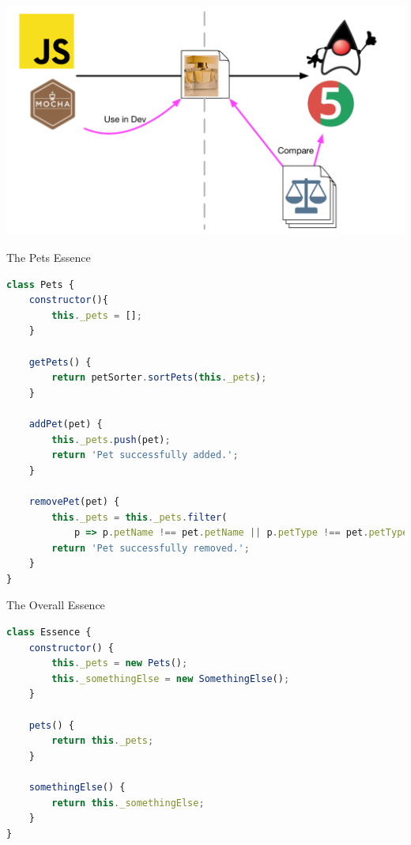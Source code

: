 \begin{frame}[fragile]{}

\includegraphics[width=\textwidth]{images/Essence-4.pdf}

\end{frame}


\begin{frame}[fragile]{The Pets Essence}

\begin{lstlisting}[language=JavaScript]
class Pets {
    constructor(){
        this._pets = [];
    }

    getPets() {
        return petSorter.sortPets(this._pets);
    }

    addPet(pet) {
        this._pets.push(pet);
        return 'Pet successfully added.';
    }

    removePet(pet) {
        this._pets = this._pets.filter(
            p => p.petName !== pet.petName || p.petType !== pet.petType);
        return 'Pet successfully removed.';
    }
}
\end{lstlisting}

\end{frame}

\begin{frame}[fragile]{The Overall Essence}

\begin{lstlisting}[language=Javascript]
class Essence {
    constructor() {
        this._pets = new Pets();
        this._somethingElse = new SomethingElse();
    }

    pets() {
        return this._pets;
    }
    
    somethingElse() {
        return this._somethingElse;
    }
}
\end{lstlisting}

\end{frame}

